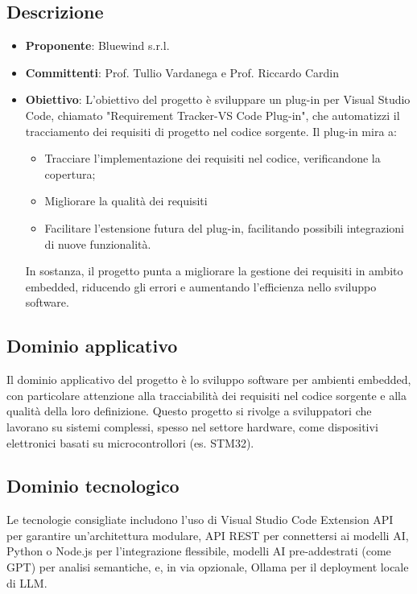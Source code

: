 \documentclass[italian, 12pt]{article}
\begin{document}
\subsection{Descrizione}
\begin{itemize}
\item\textbf{Proponente}: Bluewind s.r.l.
\item\textbf{Committenti}: Prof. Tullio Vardanega e Prof. Riccardo Cardin
\item\textbf{Obiettivo}: L'obiettivo del progetto è sviluppare un plug-in per Visual Studio Code, chiamato "Requirement Tracker-VS Code Plug-in", che automatizzi il tracciamento dei requisiti di progetto nel codice sorgente.
Il plug-in mira a:
\begin{itemize}
\item Tracciare l'implementazione dei requisiti nel codice, verificandone la copertura;
\item Migliorare la qualità dei requisiti
\item Facilitare l'estensione futura del plug-in, facilitando possibili integrazioni di nuove funzionalità.
\end{itemize}
In sostanza, il progetto punta a migliorare la gestione dei requisiti in ambito embedded, riducendo gli errori e aumentando l'efficienza nello sviluppo software.
\end{itemize}

\subsection{Dominio applicativo}
Il dominio applicativo del progetto è lo sviluppo software per ambienti embedded, con particolare attenzione alla tracciabilità dei requisiti nel codice sorgente e alla qualità della loro definizione. Questo progetto si rivolge a sviluppatori che lavorano su sistemi complessi, spesso nel settore hardware, come dispositivi elettronici basati su microcontrollori (es. STM32).

\subsection{Dominio tecnologico}
Le tecnologie consigliate includono l'uso di Visual Studio Code Extension API per garantire un'architettura modulare, API REST per connettersi ai modelli AI, Python o Node.js per l'integrazione flessibile, modelli AI pre-addestrati (come GPT) per analisi semantiche, e, in via opzionale, Ollama per il deployment locale di LLM.
\end{document}
